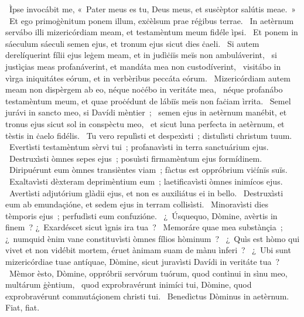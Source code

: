 {~Ìpse invocábit me, «~Pater meus es tu, Deus meus, et susċèptor salútis meae.~»
~Et ego primoġènitum ponem illum, exċèlsum prae réġibus terrae. 
~In aetèrnum servábo illi mizericórdiam meam, et testamèntum meum fidéle ìpsi. 
~Et ponem in sáeculum sáeculi semen ejus, et tronum ejus sicut dies ċaeli. 
~Si autem derelíquerint fílii ejus leġem meam, et in judìċiïs meïs non ambuláverint, 
~si justìçias meas profanáverint, et mandáta mea non custodíverint, 
~visitábo in vìrga iniquitátes eórum, et in verbèribus peccáta eórum. 
~Mizericórdiam autem meam non dispèrgem ab eo, néque noċébo in veritáte mea, 
~néque profanábo testamèntum meum, et quae proċédunt de lábiïs meïs non faċiam ìrrita. 
~Semel jurávi in sancto meo, si Davídi mèntier~; 
~semen ejus in aetèrnum manébit, et tronus ejus sicut sol in conspèctu meo, 
~et sicut luna perfecta in aetèrnum, et tèstis in ċaelo fidélis. 
~Tu vero repulìsti et despexìsti~; distulìsti christum tuum. 
~Evertìsti testamèntum sèrvi tui~; profanavìsti in terra sanctuárium ejus. 
~Destruxìsti òmnes sepes ejus~; posuìsti firmamèntum ejus formídinem. 
~Diripuérunt eum òmnes transièntes viam~; fàctus est oppróbrium viċínïs suïs. 
~Exaltavìsti dèxteram deprimèntium eum~; laetificavìsti òmnes inimícos ejus. 
~Avertìsti adjutórium glàdii ejus, et non es auxiliátus ei in bello. 
~Destruxìsti eum ab emundaçióne, et sedem ejus in terram collisìsti. 
~Minoravìsti dies tèmporis ejus~; perfudìsti eum confuzióne. 
~¿~Úsquequo, Dòmine, avèrtis in finem~? ¿~Exardéscet sicut ìgnis ira tua~? 
~Memoráre quae mea substànçia~; ¿~numquid ènim vane constituvìsti òmnes fílios hòminum~? 
~¿~Quìs est hòmo qui vivet et non vidébit mortem, éruet ànimam suam de mànu ìnferi~? 
~¿~Ubi sunt mizericórdiae tuae antíquae, Dòmine, sicut juravìsti Davídi in veritáte tua~? 
~Mèmor èsto, Dòmine, oppróbrii servórum tuórum, quod contìnui in sìnu meo, multárum ġèntium, 
~quod exprobravérunt inimíci tui, Dòmine, quod exprobravérunt commutáçionem christi tui. 
~Benedìctus Dòminus in aetèrnum. Fiat, fiat. 
}
